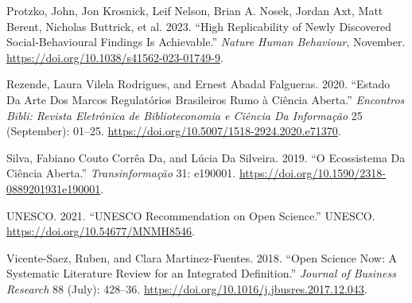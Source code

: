 \documentclass[
  a4paper,
]{article}
\newlength{\cslhangindent}
\newenvironment{CSLReferences}[2] %
 {\begin{list}{}{%
  \setlength{\itemindent}{0pt}
  \setlength{\leftmargin}{0pt}
  \setlength{\parsep}{0pt}
  \ifodd #1
   \setlength{\leftmargin}{\cslhangindent}
   \setlength{\itemindent}{-1\cslhangindent}
  \fi
  \setlength{\itemsep}{#2\baselineskip}}}
 {\end{list}}
\begin{document}
\begin{CSLReferences}{1}{0}
Protzko, John, Jon Krosnick, Leif Nelson, Brian A. Nosek, Jordan Axt,
Matt Berent, Nicholas Buttrick, et al. 2023. {``High {Replicability} of
{Newly Discovered Social-Behavioural Findings Is Achievable}.''}
\emph{Nature Human Behaviour}, November.
\url{https://doi.org/10.1038/s41562-023-01749-9}.

Rezende, Laura Vilela Rodrigues, and Ernest Abadal Falgueras. 2020.
{``Estado {Da Arte Dos Marcos Regulat{ó}rios Brasileiros Rumo} {à}
{Ci{ê}ncia Aberta}.''} \emph{Encontros Bibli: Revista Eletr{ô}nica de
Biblioteconomia e Ci{ê}ncia Da Informa{ç}{ã}o} 25 (September): 01--25.
\url{https://doi.org/10.5007/1518-2924.2020.e71370}.

Silva, Fabiano Couto Corrêa Da, and Lúcia Da Silveira. 2019. {``O
{Ecossistema Da Ci{ê}ncia Aberta}.''} \emph{Transinforma{ç}{ã}o} 31:
e190001. \url{https://doi.org/10.1590/2318-0889201931e190001}.

UNESCO. 2021. {``{UNESCO Recommendation} on {Open Science}.''} UNESCO.
\url{https://doi.org/10.54677/MNMH8546}.

Vicente-Saez, Ruben, and Clara Martinez-Fuentes. 2018. {``Open {Science
Now}: {A Systematic Literature Review} for an {Integrated
Definition}.''} \emph{Journal of Business Research} 88 (July): 428--36.
\url{https://doi.org/10.1016/j.jbusres.2017.12.043}.

\end{CSLReferences}
\end{document}
